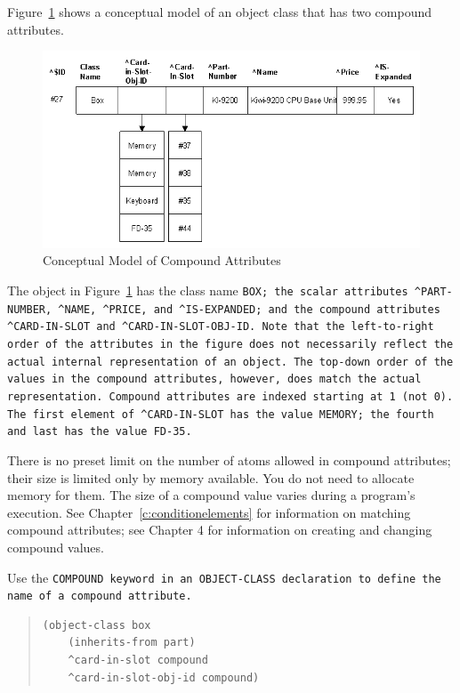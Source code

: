 Figure~\ref{f:2-6} shows a conceptual model of an object class that
has two compound attributes.

\begin{figure}[h]
  \centering
  \includegraphics[scale=0.7]{f2-6}
  \caption{Conceptual Model of Compound Attributes}
  \label{f:2-6}
\end{figure}

The object in Figure~\ref{f:2-6} has the class name \tt{BOX}; the scalar
attributes \verb|^PART-NUMBER|, \verb|^NAME|, \verb|^PRICE|, and
\verb|^IS-EXPANDED|; and the compound attributes \verb|^CARD-IN-SLOT|
and \verb|^CARD-IN-SLOT-OBJ-ID|. Note that the left-to-right order of
the attributes in the figure does not necessarily reflect the actual
internal representation of an object. The top-down order of the values
in the compound attributes, however, does match the actual
representation. Compound attributes are indexed starting at 1 (not
0). The first element of \verb|^CARD-IN-SLOT| has the value
\verb|MEMORY|; the fourth and last has the value \verb|FD-35|.

There is no preset limit on the number of atoms allowed in compound
attributes; their size is limited only by memory available. You do not
need to allocate memory for them. The size of a compound value varies
during a program's execution.  See Chapter~\ref{c:conditionelements}
for information on matching compound attributes; see Chapter 4 for
information on creating and changing compound values.

Use the \tt{COMPOUND} keyword in an \tt{OBJECT-CLASS} declaration to
define the name of a compound attribute.
\begin{quote}
\begin{verbatim}
(object-class box
    (inherits-from part)
    ^card-in-slot compound
    ^card-in-slot-obj-id compound)
\end{verbatim}
\end{quote}

